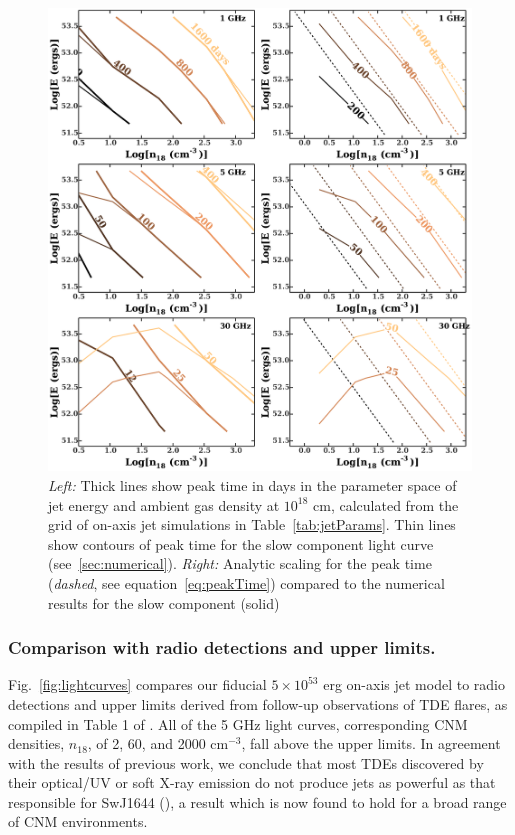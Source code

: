 \documentclass[usenatbib,fleqn]{mnras}
\begin{document}
\begin{figure}
  \includegraphics[width=16cm]{tp_contours_new.pdf}
  \caption{\label{fig:ContoursTp} {\it {Left:}} Thick lines show peak
    time in days in the parameter space of jet energy and ambient gas
    density at $10^{18}$ cm, calculated from the grid of on-axis jet
    simulations in Table~\ref{tab:jetParams}. Thin lines show contours
    of peak time for the slow component light curve
    (see~\ref{sec:numerical}). {\it Right:} Analytic scaling for the
    peak time ({\it dashed}, see equation~\ref{eq:peakTime}) compared
    to the numerical results for the slow component (solid)}
\end{figure}

\subsubsection{Comparison with radio detections and upper limits.}
\label{sec:upLims}

Fig.~\ref{fig:lightcurves} compares our fiducial $5\times 10^{53}$ erg
on-axis jet model to radio detections and upper limits derived from
follow-up observations of TDE flares, as compiled in Table 1 of
\citealt{Mimica+2015}.  All of the 5 GHz light curves, corresponding
CNM densities, $n_{18}$, of 2, 60, and 2000 cm$^{-3}$, fall above the upper
limits. In agreement with the results of previous work, we conclude
that most TDEs discovered by their optical/UV or soft X-ray emission
do not produce jets as powerful as that responsible for SwJ1644
(\citealt{Bower+2013,van-Velzen+2013,Mimica+2015}), a result which is
now found to hold for a broad range of CNM environments.
\end{document}
